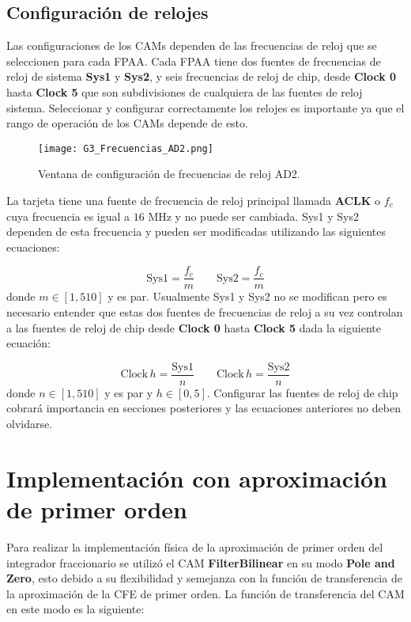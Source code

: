 	
	\subsection{Configuración de relojes}
	
	Las configuraciones de los CAMs dependen de las frecuencias de reloj que se seleccionen para cada FPAA. Cada FPAA tiene dos fuentes de frecuencias de reloj de sistema \textbf{Sys1} y \textbf{Sys2}, y seis frecuencias de reloj de chip, desde \textbf{Clock 0} hasta \textbf{Clock 5} que son subdivisiones de cualquiera de las fuentes de reloj sistema. Seleccionar y configurar correctamente los relojes es importante ya que el rango de operación de los CAMs depende de esto. 
	
\begin{figure}[!hbp] 
\caption{Ventana de configuración de frecuencias de reloj AD2.}
\label{fig:G3_Frecuencias_AD2.png}
\centering
\texttt{[image: G3\_Frecuencias\_AD2.png]}
\end{figure}

La tarjeta tiene una fuente de frecuencia de reloj principal llamada \textbf{ACLK} o $f_{c}$ cuya frecuencia es igual a $16$ MHz y no puede ser cambiada. Sys1 y Sys2 dependen de esta frecuencia y pueden ser modificadas utilizando las siguientes ecuaciones:

\begin{equation}
\mathrm{Sys1} = \frac{f_{c}}{m} \qquad \mathrm{Sys2} = \frac{f_{c}}{m}
\label{ec:sys_clock}
\end{equation}
donde $m\in [1,510]$ y es par. Usualmente Sys1 y Sys2 no se modifican pero es necesario entender que estas dos fuentes de frecuencias de reloj a su vez controlan a las fuentes de reloj de chip desde \textbf{Clock 0} hasta \textbf{Clock 5} dada la siguiente ecuación:

\begin{equation}
	\mathrm{Clock\,} h = \frac{\mathrm{Sys1}}{n}	\qquad   \mathrm{Clock\,} h = \frac{\mathrm{Sys2}}{n}
	\label{ec:clock_h}
\end{equation}
donde $n\in[1,510]$ y es par y $h\in[0,5]$. Configurar las fuentes de reloj de chip cobrará importancia en secciones posteriores y las ecuaciones anteriores no deben olvidarse.
	\section{Implementación con aproximación de primer orden}
	
	Para realizar la implementación física de la aproximación de primer orden del integrador fraccionario se utilizó el CAM \textbf{FilterBilinear} en su modo \textbf{Pole and Zero}, esto debido a su flexibilidad y semejanza con la función de transferencia de la aproximación de la CFE de primer orden. La función de transferencia del CAM en este modo es la siguiente:
	
